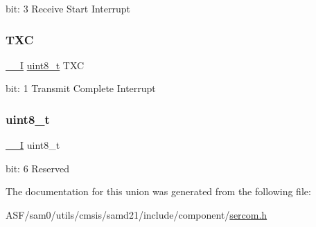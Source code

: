 bit\+: 3 Receive Start Interrupt \mbox{\label{union_s_e_r_c_o_m___u_s_a_r_t___i_n_t_f_l_a_g___type_a79c6db23e2db2b1ff2aded896a392fb3}} 
\subsubsection{\texorpdfstring{TXC}{TXC}}
{\footnotesize\ttfamily \mbox{\hyperlink{core__cm0plus_8h_af63697ed9952cc71e1225efe205f6cd3}{\+\_\+\+\_\+I}} \mbox{\hyperlink{union_s_e_r_c_o_m___u_s_a_r_t___i_n_t_f_l_a_g___type_a5b4208c6f4c4a4290c4f2804d1eb1d5b}{uint8\+\_\+t}} T\+XC}

bit\+: 1 Transmit Complete Interrupt \mbox{\label{union_s_e_r_c_o_m___u_s_a_r_t___i_n_t_f_l_a_g___type_a5b4208c6f4c4a4290c4f2804d1eb1d5b}} 
\subsubsection{\texorpdfstring{uint8\_t}{uint8\_t}}
{\footnotesize\ttfamily \mbox{\hyperlink{core__cm0plus_8h_af63697ed9952cc71e1225efe205f6cd3}{\+\_\+\+\_\+I}} uint8\+\_\+t}

bit\+: 6 Reserved 

The documentation for this union was generated from the following file\+:\begin{DoxyCompactItemize}
\item 
A\+S\+F/sam0/utils/cmsis/samd21/include/component/\mbox{\hyperlink{utils_2cmsis_2samd21_2include_2component_2sercom_8h}{sercom.\+h}}\end{DoxyCompactItemize}
